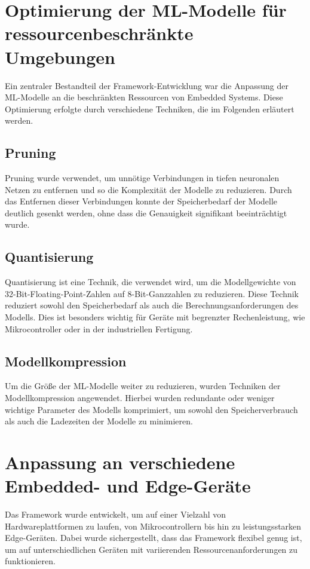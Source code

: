 \section{Optimierung der ML-Modelle für ressourcenbeschränkte Umgebungen}

Ein zentraler Bestandteil der Framework-Entwicklung war die Anpassung der ML-Modelle an die beschränkten Ressourcen von Embedded Systems. 
Diese Optimierung erfolgte durch verschiedene Techniken, die im Folgenden erläutert werden.

\subsection{Pruning}
Pruning wurde verwendet, um unnötige Verbindungen in tiefen neuronalen Netzen zu entfernen und so die Komplexität der Modelle zu reduzieren. 
Durch das Entfernen dieser Verbindungen konnte der Speicherbedarf der Modelle deutlich gesenkt werden, ohne dass die Genauigkeit signifikant beeinträchtigt wurde.

\subsection{Quantisierung}
Quantisierung ist eine Technik, die verwendet wird, um die Modellgewichte von 32-Bit-Floating-Point-Zahlen auf 8-Bit-Ganzzahlen zu reduzieren. 
Diese Technik reduziert sowohl den Speicherbedarf als auch die Berechnungsanforderungen des Modells. Dies ist besonders wichtig für Geräte mit begrenzter Rechenleistung, 
wie Mikrocontroller oder \Emb in der industriellen Fertigung.

\subsection{Modellkompression}
Um die Größe der ML-Modelle weiter zu reduzieren, wurden Techniken der Modellkompression angewendet. Hierbei wurden redundante oder weniger wichtige Parameter des Modells 
komprimiert, um sowohl den Speicherverbrauch als auch die Ladezeiten der Modelle zu minimieren.

\section{Anpassung an verschiedene Embedded- und Edge-Geräte}

Das Framework wurde entwickelt, um auf einer Vielzahl von Hardwareplattformen zu laufen, von Mikrocontrollern bis hin zu leistungsstarken Edge-Geräten. Dabei wurde 
sichergestellt, dass das Framework flexibel genug ist, um auf unterschiedlichen Geräten mit variierenden Ressourcenanforderungen zu funktionieren.

